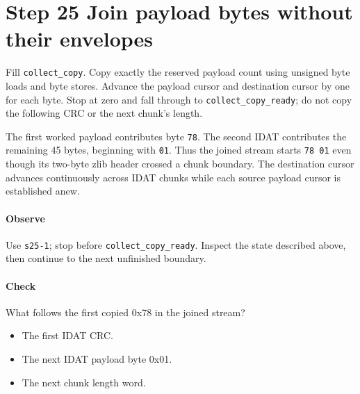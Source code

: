 \section{Step 25 Join payload bytes without their envelopes}\label{png-collect-s25}
Fill \texttt{collect\_copy}. Copy exactly the reserved payload count using unsigned byte loads and byte stores. Advance the payload cursor and destination cursor by one for each byte. Stop at zero and fall through to \texttt{collect\_copy\_ready}; do not copy the following CRC or the next chunk's length.

The first worked payload contributes byte \texttt{78}. The second IDAT contributes the remaining 45 bytes, beginning with \texttt{01}. Thus the joined stream starts \texttt{78 01} even though its two-byte zlib header crossed a chunk boundary. The destination cursor advances continuously across IDAT chunks while each source payload cursor is established anew.

\paragraph{Observe} Use \texttt{s25-1}; stop before \texttt{collect\_copy\_ready}. Inspect the state described above, then continue to the next unfinished boundary.

\paragraph{Check} What follows the first copied 0x78 in the joined stream?
\begin{itemize}
\item[A.] The first IDAT CRC.
\item[B.] The next IDAT payload byte 0x01.
\item[C.] The next chunk length word.
\end{itemize}
